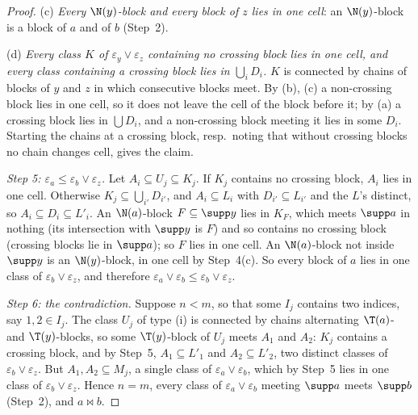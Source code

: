 \begin{proof}
(c) \emph{Every $\N(y)$-block and every block of $z$ lies in one cell}: an $\N(y)$-block is a block of $a$ and of $b$ (Step~2).

(d) \emph{Every class $K$ of $\varepsilon_y\vee\varepsilon_z$ containing no crossing block lies in one cell, and every class containing a crossing block lies in $\bigcup_iD_i$.} $K$ is connected by chains of blocks of $y$ and $z$ in which consecutive blocks meet. By (b), (c) a non-crossing block lies in one cell, so it does not leave the cell of the block before it; by (a) a crossing block lies in $\bigcup D_i$, and a non-crossing block meeting it lies in some $D_i$. Starting the chains at a crossing block, resp.\ noting that without crossing blocks no chain changes cell, gives the claim.

\smallskip\emph{Step 5: $\varepsilon_a\le\varepsilon_b\vee\varepsilon_z$.} Let $A_i\subseteq U_j\subseteq K_j$. If $K_j$ contains no crossing block, $A_i$ lies in one cell. Otherwise $K_j\subseteq\bigcup_{i'}D_{i'}$, and $A_i\subseteq L_i$ with $D_{i'}\subseteq L_{i'}$ and the $L$'s distinct, so $A_i\subseteq D_i\subseteq L'_i$. An $\N(a)$-block $F\subseteq\supp y$ lies in $K_F$, which meets $\supp a$ in nothing (its intersection with $\supp y$ is $F$) and so contains no crossing block (crossing blocks lie in $\supp a$); so $F$ lies in one cell. An $\N(a)$-block not inside $\supp y$ is an $\N(y)$-block, in one cell by Step~4(c). So every block of $a$ lies in one class of $\varepsilon_b\vee\varepsilon_z$, and therefore $\varepsilon_a\vee\varepsilon_b\le\varepsilon_b\vee\varepsilon_z$.

\smallskip\emph{Step 6: the contradiction.} Suppose $n<m$, so that some $I_j$ contains two indices, say $1,2\in I_j$. The class $U_j$ of type (i) is connected by chains alternating $\T(a)$- and $\T(y)$-blocks, so some $\T(y)$-block of $U_j$ meets $A_1$ and $A_2$: $K_j$ contains a crossing block, and by Step~5, $A_1\subseteq L'_1$ and $A_2\subseteq L'_2$, two distinct classes of $\varepsilon_b\vee\varepsilon_z$. But $A_1,A_2\subseteq M_j$, a single class of $\varepsilon_a\vee\varepsilon_b$, which by Step~5 lies in one class of $\varepsilon_b\vee\varepsilon_z$. Hence $n=m$, every class of $\varepsilon_a\vee\varepsilon_b$ meeting $\supp a$ meets $\supp b$ (Step~2), and $a\bowtie b$.
\end{proof}

